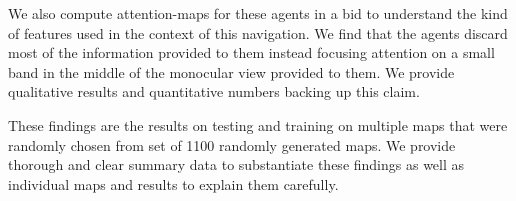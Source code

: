 We also compute attention-maps for these agents in a bid to understand the kind of features used in the context of this navigation. We find that the agents discard most of the information provided to them instead focusing attention on a small band in the middle of the monocular view provided to them. We provide qualitative results and quantitative numbers backing up this claim.

These findings are the results on testing and training on multiple maps that were randomly chosen from set of 1100 randomly generated maps. We provide thorough and clear summary data to substantiate these findings as well as individual maps and results to explain them carefully. 
